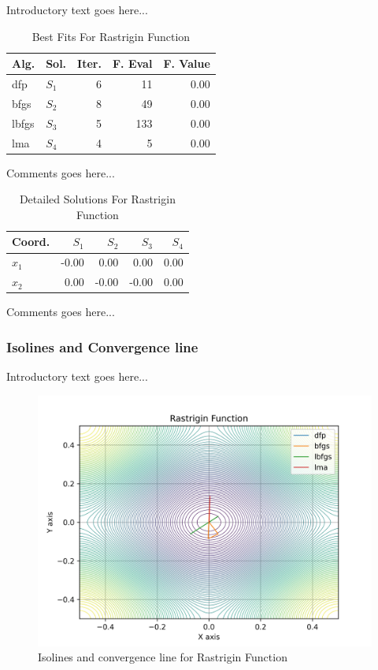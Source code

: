 \documentclass{ieeeaccess}
\begin{document}
Introductory text goes here...
\begin{table}
\centering
\caption{Best Fits For Rastrigin Function}
\label{solutions:rastrigin2d}
\begin{tabular}{llrrr}
\toprule
 Alg. &    Sol. &  Iter. &  F. Eval &  F. Value \\
\midrule
  dfp & $S_{1}$ &      6 &       11 &      0.00 \\
 bfgs & $S_{2}$ &      8 &       49 &      0.00 \\
lbfgs & $S_{3}$ &      5 &      133 &      0.00 \\
  lma & $S_{4}$ &      4 &        5 &      0.00 \\
\bottomrule
\end{tabular}
\end{table}


Comments goes here...
\begin{table}
\centering
\caption{Detailed Solutions For Rastrigin Function}
\label{detailedsolutions:rastrigin2d}
\begin{tabular}{lrrrr}
\toprule
 Coord. &  $S_{1}$ &  $S_{2}$ &  $S_{3}$ &  $S_{4}$ \\
\midrule
$x_{1}$ &    -0.00 &     0.00 &     0.00 &     0.00 \\
$x_{2}$ &     0.00 &    -0.00 &    -0.00 &     0.00 \\
\bottomrule
\end{tabular}
\end{table}


Comments goes here...
\subsubsection{Isolines and Convergence line}
\label{isolinesrastrigin2d2D}


Introductory text goes here...
\begin{figure}[h]
\centering
\includegraphics[scale=0.5]{images/rastrigin2d.jpg}
\caption{Isolines and convergence line for Rastrigin Function}
\label{fig:rastrigin2d}
\end{figure}
\end{document}
